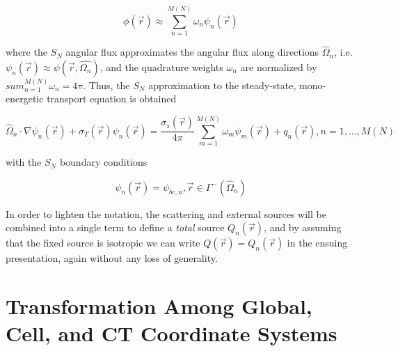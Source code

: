 \begin{equation}
    \phi (\Vec{r} ) \approx \sum_{n=1}^{M(N)} \omega_n \psi_n ( \Vec{r} )
\end{equation}

\noindent where the $S_N$ angular flux approximates the angular flux along directions $\hat{\Omega}_n$, i.e. $\psi_n ( \Vec{r} ) \approx \psi ( \Vec{r} , \hat{\Omega_n} ) $, and the quadrature weights $\omega_n$ are normalized by $sum_{n=1}^{M(N)} \omega_n = 4 \pi$.
Thus, the $S_N$ approximation to the steady-state, mono-energetic transport equation is obtained

\begin{equation}
    \hat{\Omega}_n  \cdot \nabla \psi_n ( \Vec{r} ) + \sigma_T (\Vec{r}) \psi_n ( \Vec{r} ) = \frac{\sigma_s ( \Vec{r} )}{4 \pi} \sum_{m=1}^{M(N)} \omega_m \psi_m ( \Vec{r} ) + q_n (\Vec{r}), n=1,...,M(N)
\end{equation}

\noindent with the $S_N$ boundary conditions

\begin{equation}
    \psi_n ( \Vec{r} ) = \psi_{bc,n}, \Vec{r} \in \Gamma^- ( \hat{\Omega}_n )
\end{equation}

In order to lighten the notation, the scattering and external sources will be combined into a single term to define a \textit{total} source $Q_n ( \vec{r})$, and by assuming that the fixed source is isotropic we can write $Q ( \vec{r} ) = Q_n ( \vec{r})$ in the ensuing presentation, again without any loss of generality.

\section{Transformation Among Global, Cell, and \ac{CT} Coordinate Systems}

